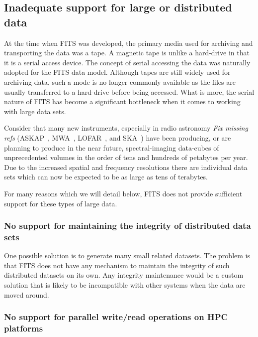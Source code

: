 \documentclass[final,authoryear,5p,times,twocolumn]{elsarticle}
\begin{document}
{{\subsection{Inadequate support for large or distributed data}
\label{section_poor_large_data_support}

At the time when FITS was developed, the primary media used for
archiving and transporting the data was a tape. A magnetic tape is
unlike a hard-drive in that it is a serial access device.  The concept
of serial accessing the data was naturally adopted for the FITS data
model.  Although tapes are still widely used for archiving data,
such a mode is no longer commonly available as the files are usually
transferred to a hard-drive before being accessed. What is more, the
serial nature of FITS has become a significant bottleneck when it comes
to working with large data sets.


Consider that many new instruments, especially in radio astronomy 
{\color{red} \textit{Fix missing refs} (ASKAP~\citep{ASKAP..09},
MWA~\citep{2012rsri.confE..36T}, LOFAR~\citep{2013A&A...556A...2V}, and SKA~\citep{ska-exascale})
}
have been producing, or are planning to produce in the near future, 
spectral-imaging data-cubes of unprecedented volumes in the order of
tens and hundreds of petabytes per year. Due to the increased spatial and frequency
resolutions there are individual data sets which can now be expected to be as 
large as tens of terabytes.


For many reasons which we will detail below, FITS does not provide sufficient
support for these types of large data.

\subsubsection{No support for maintaining the integrity of distributed data sets}

One possible solution is to generate many small related datasets.
The problem is that FITS does not have any mechanism to maintain the
integrity of such distributed datasets on its own. Any integrity
maintenance would be a custom solution that is likely to be
incompatible with other systems when the data are moved around.

\subsubsection{No support for parallel write/read operations on HPC platforms}

}}
\end{document}
